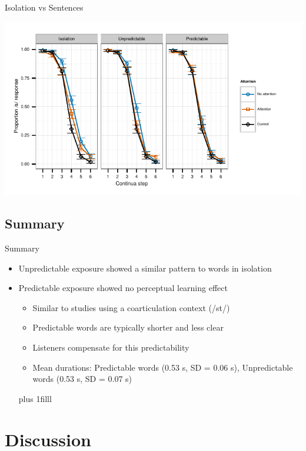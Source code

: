 \documentclass{beamer}
\newcommand{\btVFill}{\vskip0pt plus 1filll}
\begin{document}
\begin{frame}{Isolation vs Sentences}

\includegraphics{graphs/exp23_categresults_present}
\end{frame}

\subsection{Summary}

\begin{frame}{Summary}

\begin{itemize}
\item Unpredictable exposure showed a similar pattern to words in isolation
\item Predictable exposure showed no perceptual learning effect
\begin{itemize}
\item Similar to studies using a coarticulation context (/st\textturnr/)
\item Predictable words are typically shorter and less clear
\item Listeners compensate for this predictability
\item Mean durations: Predictable words (0.53 s, SD = 0.06 s), Unpredictable words (0.53 s, SD = 0.07 s)
\end{itemize}
\btVFill
\begin{flushright}
\scriptsize
\citet{Clopper2008, Scarborough2010,Kraljic2008a}
\end{flushright}
\end{itemize}

\end{frame}

\section{Discussion}
\end{document}
